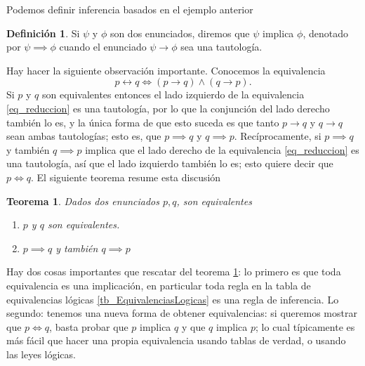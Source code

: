\documentclass{book}
\newtheorem{thm}{Teorema}[chapter]
\theoremstyle{definition}
\newtheorem{df}{Definición}[chapter]
\begin{document}
Podemos definir inferencia basados en el ejemplo anterior
\begin{df}
	Si $\psi$ y $\phi$ son dos enunciados, diremos que $\psi$ implica $\phi$, denotado por $\psi \implies \phi$ cuando el enunciado $\psi \rightarrow \phi$ sea una tautología. 
\end{df}
Hay hacer la siguiente observación importante. 
Conocemos la equivalencia %
\begin{equation}\label{eq_reduccion}
	p \leftrightarrow q \iff (p \rightarrow q) \wedge (q \rightarrow p).
\end{equation}
Si $p$ y $q$ son equivalentes entonces el lado izquierdo de la equivalencia \ref{eq_reduccion} es una tautología, por lo que la conjunción del lado derecho también lo es, y la única forma de que esto suceda es que tanto $p \rightarrow q$ y $q\rightarrow q$ sean ambas tautologías; esto es, que $p\implies q$ y $q \implies p$.
Recíprocamente, si $p \implies q$ y también $q \implies p$ implica que el lado derecho de la equivalencia \ref{eq_reduccion} es una tautología, así que el lado izquierdo también lo es; esto quiere decir que $p\iff q$.
El siguiente teorema resume esta discusión
\begin{thm}\label{thm_equivalenciaEquivalencias}
	Dados dos enunciados $p,q$, son equivalentes
	\begin{enumerate}
		\item $p$ y $q$ son equivalentes.
		\item $p \implies q$ y también $q \implies p$
	\end{enumerate}
\end{thm}
Hay dos cosas importantes que rescatar del teorema \ref{thm_equivalenciaEquivalencias}:
lo primero es que toda equivalencia es una implicación, en particular toda regla en la tabla de equivalencias lógicas \ref{tb_EquivalenciasLogicas} es una regla de inferencia.
Lo segundo: tenemos una nueva forma de obtener equivalencias: si queremos mostrar que $p \iff q$, basta probar que $p$ implica $q$ y que $q$ implica $p$; lo cual típicamente es más fácil que hacer una propia equivalencia usando tablas de verdad, o usando las leyes lógicas. %
\end{document}
